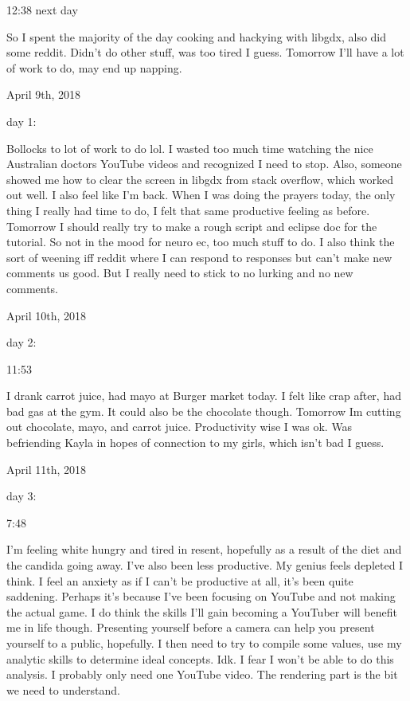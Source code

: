 12:38 next day

So I spent the majority of the day cooking and hackying with libgdx,
also did some reddit. Didn't do other stuff, was too tired I guess.
Tomorrow I'll have a lot of work to do, may end up napping.

\bigskip
\bigskip
April 9th, 2018

day 1:

Bollocks to lot of work to do lol. I wasted too much time watching the
nice Australian doctors YouTube videos and recognized I need to stop.
Also, someone showed me how to clear the screen in libgdx from stack
overflow, which worked out well. I also feel like I'm back. When I was
doing the prayers today, the only thing I really had time to do, I felt
that same productive feeling as before. Tomorrow I should really try to
make a rough script and eclipse doc for the tutorial. So not in the mood
for neuro ec, too much stuff to do. I also think the sort of weening iff
reddit where I can respond to responses but can't make new comments us
good. But I really need to stick to no lurking and no new comments.

\bigskip
\bigskip
April 10th, 2018

day 2:

11:53

I drank carrot juice, had mayo at Burger market today. I felt like crap
after, had bad gas at the gym. It could also be the chocolate though.
Tomorrow Im cutting out chocolate, mayo, and carrot juice. Productivity
wise I was ok. Was befriending Kayla in hopes of connection to my girls,
which isn't bad I guess.

\bigskip
\bigskip
April 11th, 2018

day 3:

7:48

I'm feeling white hungry and tired in resent, hopefully as a result of
the diet and the candida going away. I've also been less productive. My
genius feels depleted I think. I feel an anxiety as if I can't be
productive at all, it's been quite saddening. Perhaps it's because I've
been focusing on YouTube and not making the actual game. I do think the
skills I'll gain becoming a YouTuber will benefit me in life though.
Presenting yourself before a camera can help you present yourself to a
public, hopefully. I then need to try to compile some values, use my
analytic skills to determine ideal concepts. Idk. I fear I won't be able
to do this analysis. I probably only need one YouTube video. The
rendering part is the bit we need to understand.

